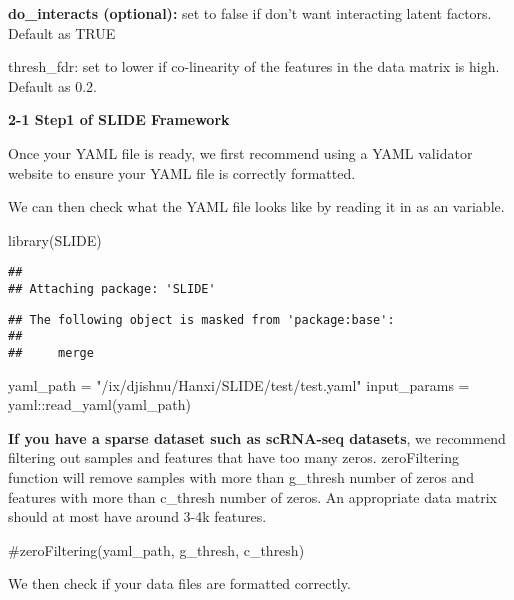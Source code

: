 \documentclass[
]{article}
\newenvironment{Shaded}{\begin{snugshade}}{\end{snugshade}}
\newcommand{\FunctionTok}[1]{\textcolor[rgb]{0.00,0.00,0.00}{#1}}
\newcommand{\NormalTok}[1]{#1}
\newcommand{\OtherTok}[1]{\textcolor[rgb]{0.56,0.35,0.01}{#1}}
\newcommand{\SpecialCharTok}[1]{\textcolor[rgb]{0.00,0.00,0.00}{#1}}
\newcommand{\StringTok}[1]{\textcolor[rgb]{0.31,0.60,0.02}{#1}}
\begin{document}
\textbf{do\_interacts (optional):} set to false if don't want
interacting latent factors. Default as TRUE

thresh\_fdr: set to lower if co-linearity of the features in the data
matrix is high. Default as 0.2.

\textbf{2-1 Step1 of SLIDE Framework}

Once your YAML file is ready, we first recommend using a YAML validator
website to ensure your YAML file is correctly formatted.

We can then check what the YAML file looks like by reading it in as an
variable.

\begin{Shaded}
\begin{Highlighting}[]
\FunctionTok{library}\NormalTok{(SLIDE)}
\end{Highlighting}
\end{Shaded}

\begin{verbatim}
## 
## Attaching package: 'SLIDE'
\end{verbatim}

\begin{verbatim}
## The following object is masked from 'package:base':
## 
##     merge
\end{verbatim}

\begin{Shaded}
\begin{Highlighting}[]
\NormalTok{yaml\_path }\OtherTok{=} \StringTok{"/ix/djishnu/Hanxi/SLIDE/test/test.yaml"}
\NormalTok{input\_params }\OtherTok{=}\NormalTok{ yaml}\SpecialCharTok{::}\FunctionTok{read\_yaml}\NormalTok{(yaml\_path)}
\end{Highlighting}
\end{Shaded}

\textbf{If you have a sparse dataset such as scRNA-seq datasets}, we
recommend filtering out samples and features that have too many zeros.
zeroFiltering function will remove samples with more than g\_thresh
number of zeros and features with more than c\_thresh number of zeros.
An appropriate data matrix should at most have around 3-4k features.

\begin{Shaded}
\begin{Highlighting}[]
\NormalTok{\#zeroFiltering(yaml\_path, g\_thresh, c\_thresh)}
\end{Highlighting}
\end{Shaded}

We then check if your data files are formatted correctly.
\end{document}
